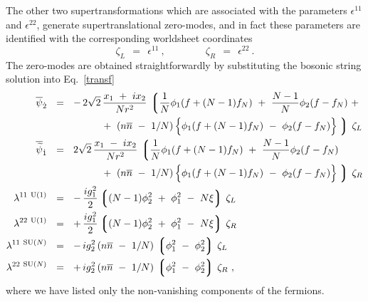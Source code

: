 \documentclass[12pt]{article}
\def\beq{\begin{equation}}
\def\eeq{\end{equation}}
\newcommand{\wt}{\widetilde}
\newcommand{\ov}{\overline}
\newcommand{\lgr}{\left\lgroup}
\newcommand{\rgr}{\right\rgroup}
\newcommand{\zr}{\zeta_R}
\newcommand{\zl}{\zeta_L}
\newcommand{\nbar}{\ov{n}}
\begin{document}
	The other two supertransformations which are associated with the parameters $ \epsilon^{11} $ and $ \epsilon^{22} $,
	generate supertranslational zero-modes, and in fact these parameters are identified with the corresponding worldsheet
	coordinates
\beq
\label{zeta}
	\zl ~~=~~ \epsilon^{11}~,  \qquad\qquad   \zr ~~=~~ \epsilon^{22}~.
\eeq
	The zero-modes are obtained straightforwardly by substituting the bosonic string solution into Eq.~\eqref{transf}
\begin{align}
\label{N2_strans}
%
\notag
\ov{\psi}_{\dot{2}}	& ~~=~~  -\,  2\sqrt{2}\, \frac{x_1 ~+~ i x_2}{N r^2} \,
		\lgr \frac{1}{N} \phi_1 ( f + (N-1) f_N ) ~+~ \frac{N-1}{N} \phi_2 ( f - f_N ) ~+~ \right.
		\\
%
\notag
			& \phantom{~~=~~  -\,  2\sqrt{2}}
			~+~ \left( n\nbar ~-~ 1/N \right )
			\Bigl\{ \phi_1 ( f + ( N-1 ) f_N ) ~-~ \phi_2 ( f - f_N) \Bigr\}
		\left. \rgr\, \zeta_L 
		\\
%
\notag
\ov{\wt{\psi}}_{\dot{1}} & ~~=~~    2\sqrt{2} \, \frac{x_1 ~-~ i x_2}{N r^2} \,
		\lgr \frac{1}{N} \phi_1 ( f + (N-1) f_N ) ~+~ \frac{N-1}{N} \phi_2 ( f - f_N ) \right.
		\\
%
\notag
			& \phantom{~~=~~  -\,  2\sqrt{2}}
			~+~ \left( n\nbar ~-~ 1/N \right )
			\Bigl\{ \phi_1 ( f + ( N-1 ) f_N ) ~-~ \phi_2 ( f - f_N) \Bigr\}
		\left. \rgr\, \zeta_R
		\\
%
\lambda^{11\ \rm U(1)} 	& ~~=~~ -\, \frac{i g_1^2}{2} \lgr (N-1)\phi_2^2  ~+~ \phi_1^2 ~-~ N\xi \rgr \, \zeta_L 
		\\
%
\notag
\lambda^{22\ \rm U(1)} 	& ~~=~~ +\, \frac{i g_1^2}{2} \lgr (N-1)\phi_2^2  ~+~ \phi_1^2 ~-~ N\xi \rgr \, \zeta_R 
		\\
%
\notag
\lambda^{11\ \text{SU($N$)}}	& ~~=~~ -\, {i g_2^2}\, ( n\nbar ~-~ 1/N )\, \lgr \phi_1^2 ~-~ \phi_2^2 \rgr\, \zeta_L
		\\
%
\notag
\lambda^{22\ \text{SU($N$)}}	& ~~=~~ +\, {i g_2^2}\, ( n\nbar ~-~ 1/N )\, \lgr \phi_1^2 ~-~ \phi_2^2 \rgr\, \zeta_R
	~,
\end{align}
	where we have listed only the non-vanishing components of the fermions.
	
\end{document}
